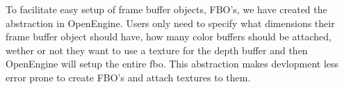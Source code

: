 
To facilitate easy setup of frame buffer objects, FBO's, we have
created the  abstraction in OpenEngine. Users only need to
specify what dimensions their frame buffer object should have, how
many color buffers should be attached, wether or not they want to use
a texture for the depth buffer and then OpenEngine will setup the
entire fbo. This abstraction makes devlopment less error prone to
create FBO's and attach textures to them.



